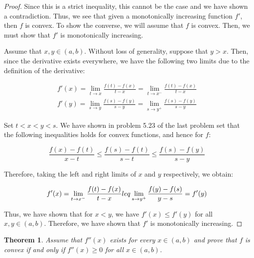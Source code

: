 \documentclass[psamsfonts]{amsart}
\newtheorem{thm}{Theorem}[section]
\theoremstyle{definition}
\theoremstyle{remark}
\numberwithin{equation}{section}
\begin{document}
\begin{proof}
Since this is a strict inequality, this cannot be the case and we have shown a contradiction. Thus, we see that given a monotonically increasing function $f'$, then $f$ is convex. To show the converse, we will assume that $f$ is convex. Then, we must show that $f'$ is monotonically increasing.

Assume that $x,y \in (a,b)$. Without loss of generality, suppose that $y > x$. Then, since the derivative exists everywhere, we have the following two limits due to the definition of the derivative:

\begin{eqnarray}
f'(x) = \lim_{t \to x} \frac{f(t) - f(x)}{t-x} = \lim_{t \to x^{-}} \frac{f(t) - f(x)}{t-x} \\
f'(y) = \lim_{s \to y} \frac{f(s) - f(y)}{s-y} = \lim_{s \to y^{+}} \frac{f(s) - f(y)}{s -y} 
\end{eqnarray}

Set $t < x < y < s$. We have shown in problem 5.23 of the last problem set that the following inequalities holds for convex functions, and hence for $f$:

\begin{equation}
\frac{f(x) - f(t)}{x-t} \leq \frac{f(s) - f(t)}{s - t} \leq \frac{f(s) - f(y)}{s-y}
\end{equation} 

Therefore, taking the left and right limits of $x$ and $y$ respectively, we obtain:

\begin{equation}
f'(x) = \lim_{t \to x^{-}} \frac{f(t) - f(x)}{t-x} \\leq \lim_{s \to y^{+}} \frac{f(y) - f(s)}{y -s} = f'(y)
\end{equation}

Thus, we have shown that for $x < y$, we have $f'(x) \leq f'(y)$ for all $x,y \in (a,b)$. Therefore, we have shown that $f'$ is monotonically increasing.

\end{proof}

\begin{thm}
Assume that $f''(x)$ exists for every $x \in (a,b)$ and prove that $f$ is convex if and only if $f''(x) \geq 0$ for all $x \in (a,b)$. 
\end{thm}
\end{document}
